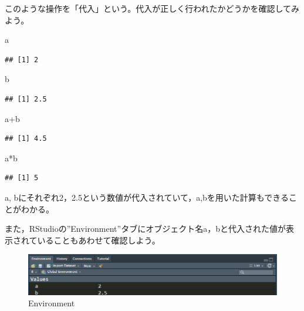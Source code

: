 \documentclass[
]{book}
\newenvironment{Shaded}{\begin{snugshade}}{\end{snugshade}}
\newcommand{\NormalTok}[1]{#1}
\newcommand{\SpecialCharTok}[1]{\textcolor[rgb]{0.00,0.00,0.00}{#1}}
\begin{document}
このような操作を「代入」という。代入が正しく行われたかどうかを確認してみよう。

\begin{Shaded}
\begin{Highlighting}[]
\NormalTok{a}
\end{Highlighting}
\end{Shaded}

\begin{verbatim}
## [1] 2
\end{verbatim}

\begin{Shaded}
\begin{Highlighting}[]
\NormalTok{b}
\end{Highlighting}
\end{Shaded}

\begin{verbatim}
## [1] 2.5
\end{verbatim}

\begin{Shaded}
\begin{Highlighting}[]
\NormalTok{a}\SpecialCharTok{+}\NormalTok{b}
\end{Highlighting}
\end{Shaded}

\begin{verbatim}
## [1] 4.5
\end{verbatim}

\begin{Shaded}
\begin{Highlighting}[]
\NormalTok{a}\SpecialCharTok{*}\NormalTok{b}
\end{Highlighting}
\end{Shaded}

\begin{verbatim}
## [1] 5
\end{verbatim}

a, bにそれぞれ2，2.5という数値が代入されていて，a,bを用いた計算もできることがわかる。

また，RStudioの''Environment''タブにオブジェクト名a，bと代入された値が表示されていることもあわせて確認しよう。

\begin{figure}
\centering
\includegraphics{ab.png}
\caption{Environment}
\end{figure}
\end{document}
